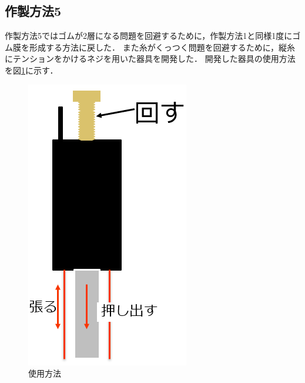 \subsection{作製方法5}
作製方法5ではゴムが2層になる問題を回避するために，作製方法1と同様1度にゴム膜を形成する方法に戻した．
また糸がくっつく問題を回避するために，縦糸にテンションをかけるネジを用いた器具を開発した．
開発した器具の使用方法を図\ref{fig:mawa}に示す．
\begin{figure}[h]
  \centering  %
  \includegraphics[scale=0.4]{pic/mawa.PNG}
  \caption{使用方法}
  \label{fig:mawa}
\end{figure}

